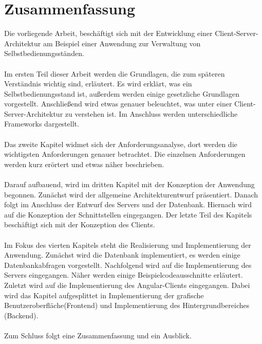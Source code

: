 \section*{Zusammenfassung}

Die vorliegende Arbeit, beschäftigt sich mit der Entwicklung einer Client-Server-Architektur am Beispiel einer Anwendung zur Verwaltung von Selbstbedienungsständen.  
\\
\\
Im ersten Teil dieser Arbeit werden die Grundlagen, die zum späteren Verständnis wichtig sind, erläutert. Es wird erklärt, was ein Selbstbedienungsstand ist, außerdem werden einige gesetzliche Grundlagen vorgestellt. Anschließend wird etwas genauer beleuchtet, was unter einer Client-Server-Architektur zu verstehen ist. Im Anschluss werden unterschiedliche Frameworks dargestellt.
\\
\\
Das zweite Kapitel widmet sich der Anforderungsanalyse, dort werden die wichtigsten Anforderungen genauer betrachtet. Die einzelnen Anforderungen werden kurz erörtert und etwas näher beschrieben.
\\
\\
Darauf aufbauend, wird im dritten Kapitel mit der Konzeption der Anwendung begonnen. Zunächst wird der allgemeine Architekturentwurf präsentiert. Danach folgt im Anschluss der Entwurf des Servers und der Datenbank. Hiernach wird auf die Konzeption der Schnittstellen eingegangen. Der letzte Teil des Kapitels beschäftigt sich mit der Konzeption des Clients.
\\
\\
Im Fokus des vierten Kapitels steht die Realisierung und Implementierung der Anwendung. Zunächst wird die Datenbank implementiert, es werden einige Datenbankabfragen vorgestellt. Nachfolgend wird auf die Implementierung des Servers eingegangen. Näher werden einige Beispielcodeausschnitte erläutert. Zuletzt wird auf die Implementierung des Angular-Clients eingegangen. Dabei wird das Kapitel aufgesplittet in Implementierung der grafische Benutzeroberfläche(Frontend) und Implementierung des Hintergrundbereiches (Backend).
\\
\\
Zum Schluss folgt eine Zusammenfassung und ein Ausblick.


